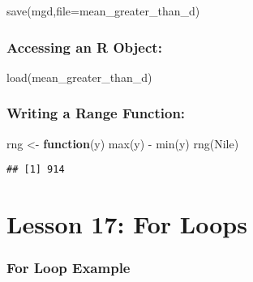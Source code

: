 \documentclass[
]{article}
\newenvironment{Shaded}{\begin{snugshade}}{\end{snugshade}}
\newcommand{\AttributeTok}[1]{\textcolor[rgb]{0.77,0.63,0.00}{#1}}
\newcommand{\ControlFlowTok}[1]{\textcolor[rgb]{0.13,0.29,0.53}{\textbf{#1}}}
\newcommand{\FunctionTok}[1]{\textcolor[rgb]{0.00,0.00,0.00}{#1}}
\newcommand{\NormalTok}[1]{#1}
\newcommand{\OtherTok}[1]{\textcolor[rgb]{0.56,0.35,0.01}{#1}}
\newcommand{\SpecialCharTok}[1]{\textcolor[rgb]{0.00,0.00,0.00}{#1}}
\newcommand{\StringTok}[1]{\textcolor[rgb]{0.31,0.60,0.02}{#1}}
\begin{document}
\begin{Shaded}
\begin{Highlighting}[]
\FunctionTok{save}\NormalTok{(mgd,}\AttributeTok{file=}\StringTok{\textquotesingle{}mean\_greater\_than\_d\textquotesingle{}}\NormalTok{)}
\end{Highlighting}
\end{Shaded}

\hypertarget{accessing-an-r-object}{%
\subsubsection{Accessing an R Object:}\label{accessing-an-r-object}}

\begin{Shaded}
\begin{Highlighting}[]
\FunctionTok{load}\NormalTok{(}\StringTok{\textquotesingle{}mean\_greater\_than\_d\textquotesingle{}}\NormalTok{)}
\end{Highlighting}
\end{Shaded}

\hypertarget{writing-a-range-function}{%
\subsubsection{Writing a Range
Function:}\label{writing-a-range-function}}

\begin{Shaded}
\begin{Highlighting}[]
\NormalTok{rng }\OtherTok{\textless{}{-}} \ControlFlowTok{function}\NormalTok{(y) }\FunctionTok{max}\NormalTok{(y) }\SpecialCharTok{{-}} \FunctionTok{min}\NormalTok{(y)}
\FunctionTok{rng}\NormalTok{(Nile)}
\end{Highlighting}
\end{Shaded}

\begin{verbatim}
## [1] 914
\end{verbatim}

\hypertarget{lesson-17-for-loops}{%
\section{Lesson 17: For Loops}\label{lesson-17-for-loops}}

\hypertarget{for-loop-example}{%
\subsubsection{For Loop Example}\label{for-loop-example}}
\end{document}
